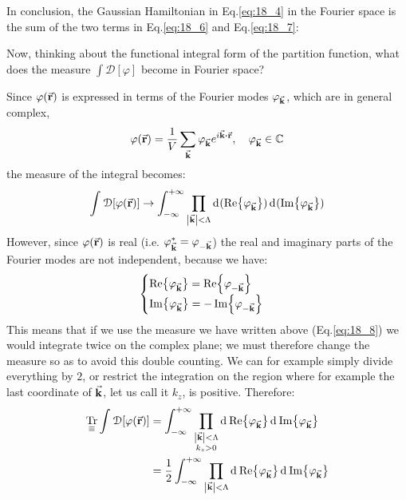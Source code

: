 \documentclass[../../Main/Main.tex]{subfiles}
\begin{document}
In conclusion, the Gaussian Hamiltonian in Eq.\eqref{eq:18_4} in the Fourier space is the sum of the two terms in Eq.\eqref{eq:18_6} and Eq.\eqref{eq:18_7}:


Now, thinking about the functional integral form of the partition function, what does the measure \( \int \mathcal{D} [\varphi ] \)  become in Fourier space?

Since \( \varphi(\va{r}) \)  is expressed in terms of the Fourier modes \( \varphi_{\va{k}} \), which are in general complex,
\begin{equation*}
  \varphi (\va{r}) = \frac{1}{V} \sum_{\va{k}}^{} \varphi _{\va{k}} e^{i \va{k} \vdot \va{r}}, \quad \varphi _{\va{k}} \in \mathbb{C}
\end{equation*}
the measure of the integral becomes:
\begin{equation}
  \int_{}^{} \mathcal{D} \qty[\varphi (\va{r})] \rightarrow \int_{- \infty }^{+ \infty } \prod_{\abs{\va{k}} < \Lambda  }^{}   \dd[]{(\Re{\varphi _{\va{k}}})}   \dd[]{(\Im{\varphi _{\va{k}}})}
  \label{eq:18_8}
\end{equation}
However, since \( \varphi (\va{r} ) \) is real (i.e. \( \varphi _{\va{k}}^* = \varphi _{-\va{k}}\)) the real and imaginary parts of the Fourier modes are not independent, because we have:
\begin{equation*}
  \begin{cases}
   \Re {\varphi _{\va{k}}} = \Re {\varphi _{-\va{k}}} \\
  \Im{\varphi _{\va{k}}} = -\Im {\varphi _{-\va{k}}}
  \end{cases}
\end{equation*}
This means that if we use the measure we have written above (Eq.\eqref{eq:18_8}) we would integrate twice on the complex plane; we must therefore change the measure so as to avoid this double counting. We can for example simply divide everything by \( 2 \), or restrict the integration on the region where for example the last coordinate of \( \va{k} \), let us call it \( k_z \), is positive. Therefore:
\begin{equation}
\begin{split}
  \underset{\equiv}{\text{Tr}}   \int_{}^{} \mathcal{D} \qty[\varphi (\va{r})]  & =
  \int_{- \infty }^{+ \infty } \prod_{\substack{ \abs{\va{k}} < \Lambda   \\ k_z > 0 } }^{}   \dd[]{\Re {\varphi _{\va{k}}}}  \dd[]{\Im {\varphi _{\va{k}}}} \\
  &= \frac{1}{2} \int_{- \infty }^{+ \infty } \prod_{\substack{ \abs{\va{k}} < \Lambda    } }^{}   \dd[]{\Re {\varphi _{\va{k}}}}  \dd[]{\Im {\varphi _{\va{k}}}}
\end{split}
\end{equation}
\end{document}
